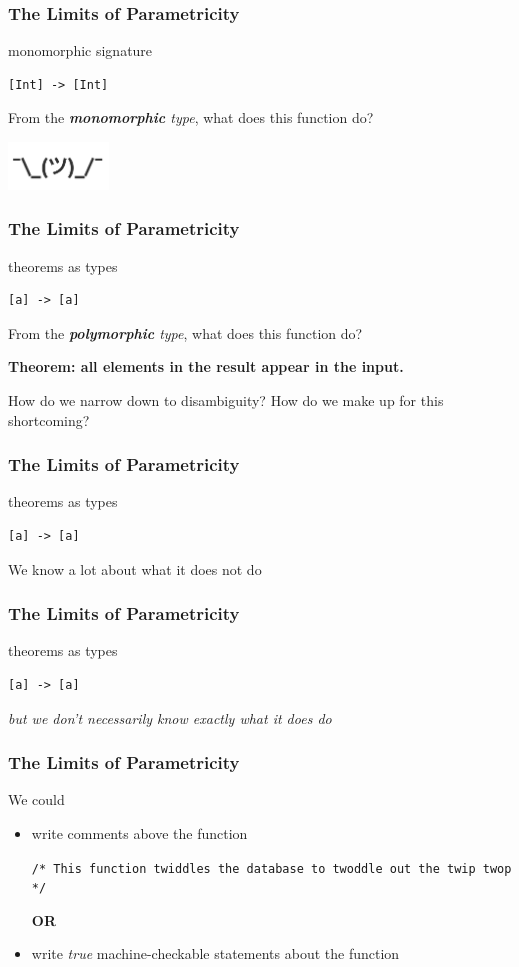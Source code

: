 \begin{frame}[fragile]
\frametitle{The Limits of Parametricity}
\begin{block}{monomorphic signature}
\begin{lstlisting}
[Int] -> [Int]
\end{lstlisting}
From the \emph{\textbf{monomorphic} type}, what does this function do?
\end{block}
\includegraphics[width=0.2\textwidth]{image/shrug.png}
\end{frame}

\begin{frame}[fragile]
\frametitle{The Limits of Parametricity}
\begin{block}{theorems as types}
\begin{lstlisting}
[a] -> [a]
\end{lstlisting}
From the \emph{\textbf{polymorphic} type}, what does this function do?
\end{block}
\large{\textbf{Theorem: all elements in the result appear in the input.}}

\tiny{How do we narrow down to disambiguity? How do we make up for this shortcoming?}
\end{frame}

\begin{frame}[fragile]
\frametitle{The Limits of Parametricity}
\begin{block}{theorems as types}
\begin{lstlisting}
[a] -> [a]
\end{lstlisting}
\end{block}
We know a lot about what it does not do
\end{frame}

\begin{frame}[fragile]
\frametitle{The Limits of Parametricity}
\begin{block}{theorems as types}
\begin{lstlisting}
[a] -> [a]
\end{lstlisting}
\end{block}
\emph{but we don't necessarily know exactly what it does do}
\end{frame}

\begin{frame}[fragile]
\frametitle{The Limits of Parametricity}
\begin{block}{We could}
\begin{itemize}
  \item<1-> write comments above the function

            \lstinline[style=csharp]{/* This function twiddles the database to twoddle out the twip twop */}

            \textbf{OR}
  \item<2-> write \emph{true} machine-checkable statements about the function
\end{itemize}
\end{block}
\end{frame}

